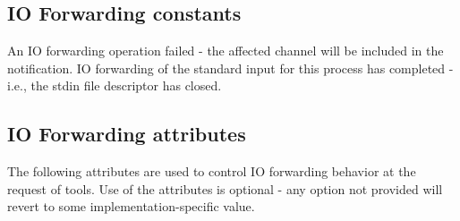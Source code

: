 \subsection{IO Forwarding constants}

\begin{constantdesc}
%
An \ac{IO} forwarding operation failed - the affected channel will be included in the notification.
%
\ac{IO} forwarding of the standard input for this process has completed - i.e., the stdin file descriptor has closed.
%
\end{constantdesc}

\subsection{IO Forwarding attributes}
\label{api:tools:attributes:iof}

The following attributes are used to control \ac{IO} forwarding behavior at the request of tools. Use of the attributes is optional - any option not provided will revert to some implementation-specific value.

